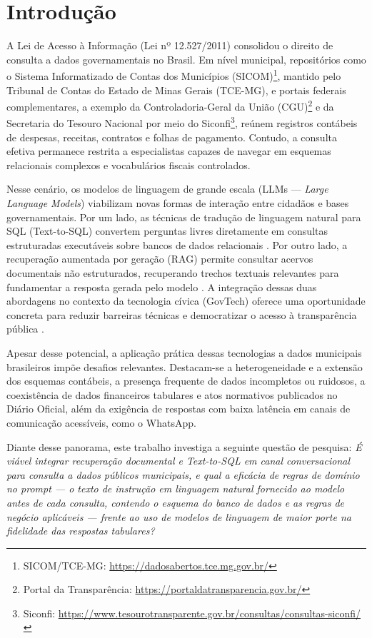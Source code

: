 \documentclass[12pt]{article}
\begin{document}
\section{Introdução}

A Lei de Acesso à Informação (Lei nº 12.527/2011) consolidou o direito de consulta a dados governamentais no Brasil. Em nível municipal, repositórios como o Sistema Informatizado de Contas dos Municípios (SICOM)\footnote{SICOM/TCE-MG: \url{https://dadosabertos.tce.mg.gov.br/}}, mantido pelo Tribunal de Contas do Estado de Minas Gerais (TCE-MG), e portais federais complementares, a exemplo da Controladoria-Geral da União (CGU)\footnote{Portal da Transparência: \url{https://portaldatransparencia.gov.br/}} e da Secretaria do Tesouro Nacional por meio do Siconfi\footnote{Siconfi: \url{https://www.tesourotransparente.gov.br/consultas/consultas-siconfi/}}, reúnem registros contábeis de despesas, receitas, contratos e folhas de pagamento. Contudo, a consulta efetiva permanece restrita a especialistas capazes de navegar em esquemas relacionais complexos e vocabulários fiscais controlados.

Nesse cenário, os modelos de linguagem de grande escala (LLMs --- \textit{Large Language Models}) viabilizam novas formas de interação entre cidadãos e bases governamentais. Por um lado, as técnicas de tradução de linguagem natural para SQL (Text-to-SQL) convertem perguntas livres diretamente em consultas estruturadas executáveis sobre bancos de dados relacionais \cite{Yu2018Spider,Li2024BIRD,Qu2025CodeS}. Por outro lado, a recuperação aumentada por geração (RAG) permite consultar acervos documentais não estruturados, recuperando trechos textuais relevantes para fundamentar a resposta gerada pelo modelo \cite{Lewis2020RAG,Gao2024RAGSurvey,Sharma2025RAGSurvey}. A integração dessas duas abordagens no contexto da tecnologia cívica (GovTech) oferece uma oportunidade concreta para reduzir barreiras técnicas e democratizar o acesso à transparência pública \cite{Janssen2020GovTech,Lei2024SICOM}.

Apesar desse potencial, a aplicação prática dessas tecnologias a dados municipais brasileiros impõe desafios relevantes. Destacam-se a heterogeneidade e a extensão dos esquemas contábeis, a presença frequente de dados incompletos ou ruidosos, a coexistência de dados financeiros tabulares e atos normativos publicados no Diário Oficial, além da exigência de respostas com baixa latência em canais de comunicação acessíveis, como o WhatsApp.

Diante desse panorama, este trabalho investiga a seguinte questão de pesquisa: \emph{É viável integrar recuperação documental e Text-to-SQL em canal conversacional para consulta a dados públicos municipais, e qual a eficácia de regras de domínio no \textit{prompt} --- o texto de instrução em linguagem natural fornecido ao modelo antes de cada consulta, contendo o esquema do banco de dados e as regras de negócio aplicáveis --- frente ao uso de modelos de linguagem de maior porte na fidelidade das respostas tabulares?}
\end{document}

